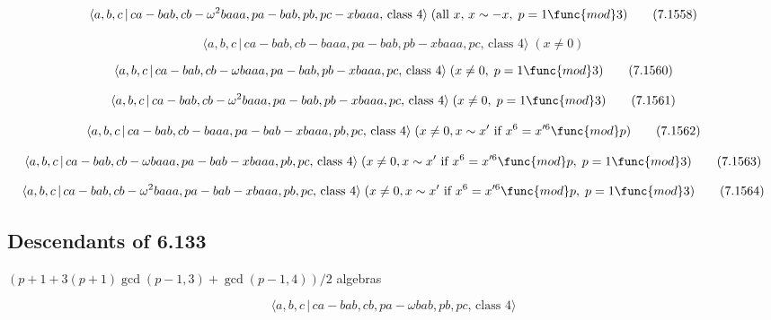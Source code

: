\documentclass[10pt]{article}
\begin{document}
\begin{equation}
\langle a,b,c\,|\,ca-bab,cb-\omega ^{2}baaa,pa-bab,pb,pc-xbaaa,\,\text{class 
}4\rangle \;(\text{all }x,\,x\sim -x,\;p=1\func{mod}3)  \tag{7.1558}
\end{equation}

\begin{equation}
\langle a,b,c\,|\,ca-bab,cb-baaa,pa-bab,pb-xbaaa,pc,\,\text{class }4\rangle
\;(x \neq 0)  \tag{7.1559}
\end{equation}

\begin{equation}
\langle a,b,c\,|\,ca-bab,cb-\omega baaa,pa-bab,pb-xbaaa,pc,\,\text{class }%
4\rangle \;(x\neq 0,\;p=1\func{mod}3)  \tag{7.1560}
\end{equation}

\begin{equation}
\langle a,b,c\,|\,ca-bab,cb-\omega ^{2}baaa,pa-bab,pb-xbaaa,pc,\,\text{class 
}4\rangle \;(x\neq 0,\;p=1\func{mod}3)  \tag{7.1561}
\end{equation}

\begin{equation}
\langle a,b,c\,|\,ca-bab,cb-baaa,pa-bab-xbaaa,pb,pc,\,\text{class }4\rangle
\;(x \neq 0, x \sim x^{\prime}\text{ if }x^6=x^{\prime 6 }\func{mod} p) 
\tag{7.1562}
\end{equation}

\begin{equation}
\langle a,b,c\,|\,ca-bab,cb-\omega baaa,pa-bab-xbaaa,pb,pc,\,\text{class }%
4\rangle \;(x\neq 0,x \sim x^{\prime }\text{ if }x^6=x^{\prime 6}\func{mod}%
p,\;p=1\func{mod}3)  \tag{7.1563}
\end{equation}

\begin{equation}
\langle a,b,c\,|\,ca-bab,cb-\omega ^{2}baaa,pa-bab-xbaaa,pb,pc,\,\text{class 
}4\rangle \;(x\neq 0,x \sim x^{\prime }\text{ if }x^6=x^{\prime 6}\func{mod}%
p,\;p=1\func{mod}3)  \tag{7.1564}
\end{equation}

\subsection{Descendants of 6.133}

$(p+1+3(p+1)\gcd (p-1,3)+\gcd (p-1,4))/2$ algebras

\begin{equation}
\langle a,b,c\,|\,ca-bab,cb,pa-\omega bab,pb,pc,\,\text{class }4\rangle 
\tag{7.1565}
\end{equation}
\end{document}
